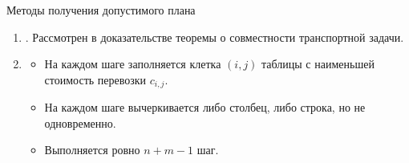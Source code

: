 \documentclass[unicode,11pt,notheorems,xcolor=table]{beamer}
\begin{document}
\begin{frame}{Методы получения допустимого плана}{}
	\begin{enumerate}
		\item 
		.
		Рассмотрен в доказательстве теоремы о совместности транспортной задачи.
		
		\item 
		\begin{itemize}
			\item На каждом шаге заполняется клетка $(i,j)$ таблицы с наименьшей стоимость перевозки $c_{i,j}$.
			\item На каждом шаге вычеркивается либо столбец, либо строка, но не одновременно.
			\item Выполняется ровно $n+m-1$ шаг.
		\end{itemize}
	\end{enumerate}
\end{frame}
\end{document}
